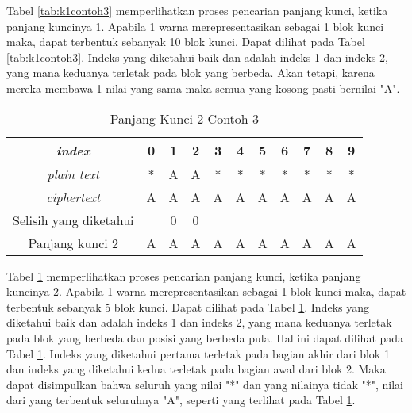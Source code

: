 	Tabel \ref{tab:k1contoh3} memperlihatkan proses pencarian panjang kunci, ketika panjang kuncinya 1. Apabila 1 warna merepresentasikan sebagai 1 blok kunci maka, dapat terbentuk sebanyak 10 blok kunci. Dapat dilihat pada Tabel \ref{tab:k1contoh3}. Indeks yang diketahui baik \plaintext dan \ciphertext adalah indeks 1 dan indeks 2, yang mana keduanya terletak pada blok yang berbeda. Akan tetapi, karena mereka membawa 1 nilai yang sama maka semua \plaintext yang kosong pasti bernilai "A".
	\\
	\begin{table}[H]
	 	\centering
	 	\caption{Panjang Kunci 2 Contoh 3}
	 	\setlength{\arrayrulewidth}{.08em}
	 	\begin{tabular}{|c|c|c|c|c|c|c|c|c|c|c|}\hline
	 	\textit{index}&0&1&2&3&4&5&6&7&8&9\\ \hline
	 	\textit{plain text}&\cellcolor{blue!15}*&\cellcolor{blue!15}A&\cellcolor{green!15}A&\cellcolor{green!15}*&\cellcolor{pink!30}*&\cellcolor{pink!30}*&\cellcolor{violet!30}*&\cellcolor{violet!30}*&\cellcolor{purple!25}*&\cellcolor{purple!25}*\\ \hline
	 	\textit{ciphertext}&\cellcolor{blue!15}A&\cellcolor{blue!15}A&\cellcolor{green!15}A&\cellcolor{green!15}A&\cellcolor{pink!30}A&\cellcolor{pink!30}A&\cellcolor{violet!30}A&\cellcolor{violet!30}A&\cellcolor{purple!25}A&\cellcolor{purple!25}A\\ \hline
		Selisih yang diketahui & &0&0& & & & & & & \\ \hline	
		Panjang kunci 2 &A&A&A&A&A&A&A&A&A&A\\ \hline 	
	 	\end{tabular}
	 	\label{tab:k2contoh3}
	\end{table}
	Tabel \ref{tab:k2contoh3} memperlihatkan proses pencarian panjang kunci, ketika panjang kuncinya 2. Apabila 1 warna merepresentasikan sebagai 1 blok kunci maka, dapat terbentuk sebanyak 5 blok kunci. Dapat dilihat pada Tabel \ref{tab:k2contoh3}. Indeks yang diketahui baik \plaintext dan \ciphertext adalah indeks 1 dan indeks 2, yang mana keduanya terletak pada blok yang berbeda dan posisi yang berbeda pula. Hal ini dapat dilihat pada Tabel \ref{tab:k2contoh3}. Indeks yang diketahui pertama terletak pada bagian akhir dari blok 1 dan indeks yang diketahui kedua terletak pada bagian awal dari blok 2. Maka dapat disimpulkan bahwa seluruh \plaintext yang nilai "*" dan \ciphertext yang nilainya tidak "*", nilai dari \plaintext yang terbentuk seluruhnya "A", seperti yang terlihat pada Tabel \ref{tab:k2contoh3}.
